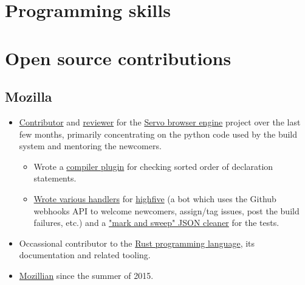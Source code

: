 \documentclass[11pt,a4paper,sans]{moderncv}        %
\newcommand\chref[3][linky]{\href{#2}{\color{#1}#3}}
\begin{document}
\section{Programming skills}

\newpage

\section{Open source contributions}
\subsection{Mozilla}
\begin{itemize}
\item \chref{https://github.com/servo/servo/commits?author=Wafflespeanut}{Contributor} and \chref{https://blog.servo.org/2016/01/11/twis-47/}{reviewer} for the \chref{https://github.com/servo/servo}{Servo browser engine} project over the last few months, primarily concentrating on the python code used by the build system and mentoring the newcomers.
\begin{itemize}
\item Wrote a \chref{https://github.com/Wafflespeanut/rust-sorty}{compiler plugin} for checking sorted order of declaration statements.
\item  \chref{https://github.com/servo/highfive/commits?author=Wafflespeanut}{Wrote various handlers} for \chref{https://github.com/servo/highfive}{highfive} (a bot which uses the Github webhooks API to welcome newcomers, assign/tag issues, post the build failures, etc.) and a \chref{https://github.com/servo/highfive/pull/115}{"mark and sweep" JSON cleaner} for the tests.
\end{itemize}
\item Occassional contributor to the \chref{https://github.com/rust-lang/rust}{Rust programming language}, its documentation and related tooling.
\item \chref{https://mozillians.org/en-US/u/wafflespeanut}{Mozillian} since the summer of 2015.
\end{itemize}
\end{document}
